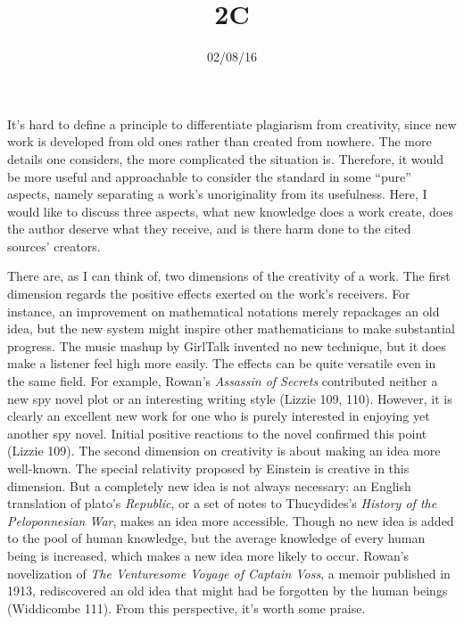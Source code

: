 \documentclass{writing}
\title{2C}
\date{02/08/16}
\begin{document}
\maketitle

It's hard to define a principle to differentiate plagiarism from
creativity, since new work is developed from old ones rather than
created from nowhere. The more details one considers, the more
complicated the situation is. Therefore, it would be more useful and
approachable to consider the standard in some ``pure'' aspects, namely
separating a work's unoriginality from its usefulness. Here, I would
like to discuss three aspects, what new knowledge does a work create,
does the author deserve what they receive, and is there harm done to the
cited sources' creators.

There are, as I can think of, two dimensions of the creativity of a
work. The first dimension regards the positive effects exerted on the
work's receivers. For instance, an improvement on mathematical notations
merely repackages an old idea, but the new system might inspire other
mathematicians to make substantial progress. The music mashup by
GirlTalk invented no new technique, but it does make a listener feel
high more easily. The effects can be quite versatile even in the same
field. For example, Rowan's \emph{Assassin of Secrets} contributed
neither a new spy novel plot or an interesting writing style (Lizzie
109, 110). However, it is clearly an excellent new work for one who is
purely interested in enjoying yet another spy novel. Initial positive
reactions to the novel confirmed this point (Lizzie 109). The second
dimension on creativity is about making an idea more well-known. The
special relativity proposed by Einstein is creative in this dimension.
But a completely new idea is not always necessary: an English
translation of plato's \emph{Republic}, or a set of notes to
Thucydides's \emph{History of the Peloponnesian War}, makes an idea more
accessible. Though no new idea is added to the pool of human knowledge,
but the average knowledge of every human being is increased, which makes
a new idea more likely to occur. Rowan's novelization of \emph{The
Venturesome Voyage of Captain Voss}, a memoir published in 1913,
rediscovered an old idea that might had be forgotten by the human beings
(Widdicombe 111). From this perspective, it's worth some praise.
\end{document}
